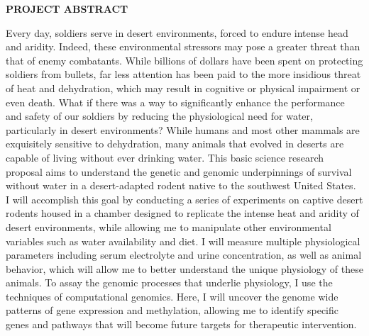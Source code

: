 \documentclass[12pt]{article}
\begin{document}

\pagestyle{empty}

\begin{center}

 \textbf{PROJECT ABSTRACT} \\

\textsc{}

\end{center}


Every day, soldiers serve in desert environments, forced to endure intense head and aridity. Indeed, these environmental stressors may pose a greater threat than that of enemy combatants. While billions of dollars have been spent on protecting soldiers from bullets, far less attention has been paid to the more insidious threat of heat and dehydration, which may result in cognitive or physical impairment or even death. What if there was a way to significantly enhance the performance and safety of our soldiers by reducing the physiological need for water, particularly in desert environments? While humans and most other mammals are exquisitely sensitive to dehydration, many animals that evolved in deserts are capable of living without ever drinking water. This basic science research proposal aims to understand the genetic and genomic underpinnings of survival without water in a desert-adapted rodent native to the southwest United States. \\



I will accomplish this goal by conducting a series of experiments on captive desert rodents housed in a chamber designed to replicate the intense heat and aridity of desert environments, while allowing me to manipulate other environmental variables such as water availability and diet. I will measure multiple physiological parameters including serum electrolyte and urine concentration, as well as animal behavior, which will allow me to better understand the unique physiology of these animals. To assay the genomic processes that underlie physiology, I use the techniques of computational genomics. Here, I will uncover the genome wide patterns of gene expression and methylation, allowing me to identify specific genes and pathways that will become future targets for therapeutic intervention. \\  
\end{document}
